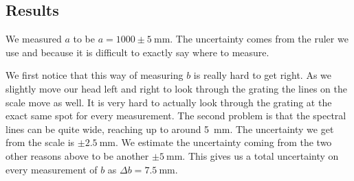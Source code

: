 \subsection{Results}
We measured $a$ to be $a = 1000 \pm \SI{5}{\milli\meter}$.
The uncertainty comes from the ruler we use and because it is difficult to exactly say where to measure.


We first notice that this way of measuring $b$ is really hard to get right.
As we slightly move our head left and right to look through the grating the lines on the scale move as well.
It is very hard to actually look through the grating at the exact same spot for every measurement.
The second problem is that the spectral lines can be quite wide, reaching up to around \SI{5}{\milli\meter}. 
The uncertainty we get from the scale is $\pm \SI{2.5}{\milli\meter}$. 
We estimate the uncertainty coming from the two other reasons above to be another $\pm \SI{5}{\milli\meter}$. 
This gives us a total uncertainty on every measurement of $b$ as $\Delta b = \SI{7.5}{\milli\meter}$.